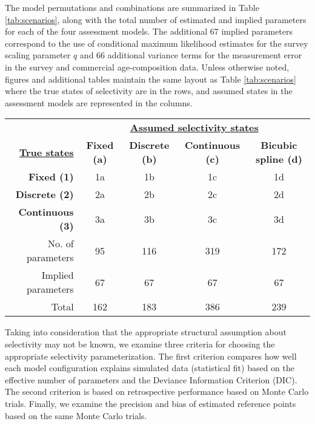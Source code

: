 The model permutations and combinations are summarized in Table \ref{tab:scenarios}, along with the total number of estimated and implied parameters for each of the four assessment models.  The additional 67 implied parameters correspond to the use of conditional maximum likelihood estimates for the survey scaling parameter $q$ and 66 additional variance terms for the measurement error in the survey and commercial age-composition data.  Unless otherwise noted, figures and additional tables maintain the same layout as Table \ref{tab:scenarios} where the true states of selectivity are in the rows, and assumed states in the assessment models are represented in the columns.

\begin{table*}[!tbh]
	\caption{List of model scenarios and labels associated with each scenario explored.  For example, scenario 2a is based on simulated data with a fixed selectivity curve, but assumes 3 discrete time blocks in the assessment model.}
	\label{tab:scenarios}
	\begin{center}
		\begin{tabular}{r|cccc}
		\hline

		\hline
		
		&\multicolumn{4}{c}{\textbf{\underline{Assumed selectivity states}}}\\
		\textbf{\textbf{\underline{True states}}}
		&\textbf{Fixed (a)} & \textbf{Discrete (b)} & \textbf{Continuous (c)} & \textbf{Bicubic spline (d)} \\
		\hline
		 \textbf{Fixed (1)}      & 1a & 1b & 1c & 1d\\
		 \textbf{Discrete (2)}   & 2a & 2b & 2c & 2d\\
		 \textbf{Continuous (3)} & 3a & 3b & 3c & 3d\\
		\hline

		\hline
		No. of parameters & 95 & 116 & 319 & 172\\
		Implied parameters & 67 &67 &67 & 67 \\
		\hline
		Total  & 162 & 183 &  386 & 239 \\
		\hline

		\hline
		\end{tabular}
	\end{center}
\end{table*}

Taking into consideration that the appropriate structural assumption about selectivity may not be known, we examine three criteria for choosing the appropriate selectivity parameterization.  The first criterion compares how well each model configuration explains simulated data (statistical fit) based on the effective number of parameters and the  Deviance Information Criterion (DIC).  The second criterion is based on retrospective performance based on Monte Carlo trials. Finally, we examine the precision and bias of estimated reference points based on the same Monte Carlo trials.

